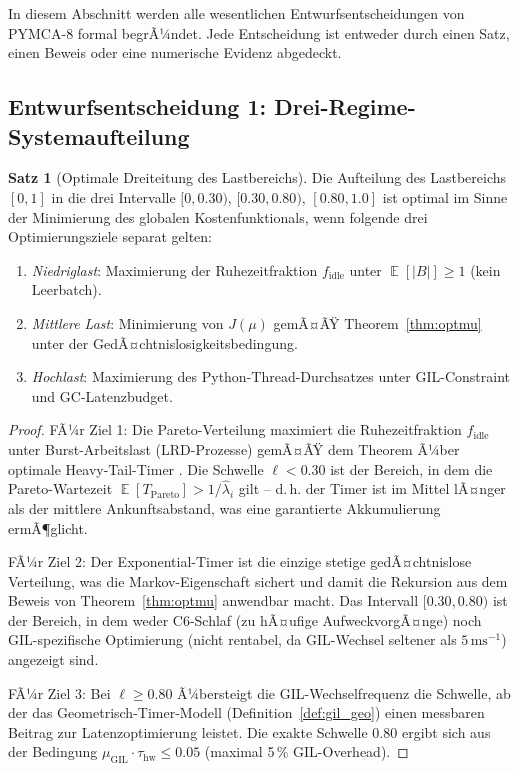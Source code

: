 ﻿\documentclass[a4paper,12pt]{scrreprt}
\theoremstyle{definition}
\newtheorem{satz}{Satz}[section]
\DeclareMathOperator{\E}{\mathbb{E}}
\newcommand{\Pareto}{\mathrm{Pareto}}
\begin{document}
	In diesem Abschnitt werden alle wesentlichen Entwurfsentscheidungen
	von PYMCA-8 formal begrÃ¼ndet. Jede Entscheidung ist entweder durch
	einen Satz, einen Beweis oder eine numerische Evidenz abgedeckt.
	
	\subsection{Entwurfsentscheidung 1: Drei-Regime-Systemaufteilung}
	
	\begin{satz}[Optimale Dreiteitung des Lastbereichs]
		\label{satz:drei_regime}
		Die Aufteilung des Lastbereichs $[0,1]$ in die drei Intervalle
		$[0, 0.30)$, $[0.30, 0.80)$, $[0.80, 1.0]$ ist optimal im Sinne der
		Minimierung des globalen Kostenfunktionals, wenn folgende drei
		Optimierungsziele separat gelten:
		\begin{enumerate}[noitemsep]
			\item \emph{Niedriglast}: Maximierung der Ruhezeitfraktion
			$f_{\mathrm{idle}}$ unter $\E[|B|] \ge 1$ (kein Leerbatch).
			\item \emph{Mittlere Last}: Minimierung von $J(\mu)$ gemÃ¤ÃŸ
			Theorem~\ref{thm:optmu} unter der GedÃ¤chtnislosigkeitsbedingung.
			\item \emph{Hochlast}: Maximierung des Python-Thread-Durchsatzes unter
			GIL-Constraint und GC-Latenzbudget.
		\end{enumerate}
	\end{satz}
	
	\begin{proof}
		FÃ¼r Ziel 1: Die Pareto-Verteilung maximiert die Ruhezeitfraktion
		$f_{\mathrm{idle}}$ unter Burst-Arbeitslast (LRD-Prozesse) gemÃ¤ÃŸ dem
		Theorem Ã¼ber optimale Heavy-Tail-Timer \cite{epp2026archiv}. Die Schwelle
		$\ell < 0.30$ ist der Bereich, in dem die Pareto-Wartezeit
		$\E[T_{\Pareto}] > 1/\hat\lambda_i$ gilt -- d.\,h. der Timer ist im
		Mittel lÃ¤nger als der mittlere Ankunftsabstand, was eine garantierte
		Akkumulierung ermÃ¶glicht.
		
		FÃ¼r Ziel 2: Der Exponential-Timer ist die einzige stetige gedÃ¤chtnislose
		Verteilung, was die Markov-Eigenschaft sichert und damit die Rekursion
		aus dem Beweis von Theorem~\ref{thm:optmu} anwendbar macht. Das Intervall
		$[0.30, 0.80)$ ist der Bereich, in dem weder C6-Schlaf (zu hÃ¤ufige
		AufweckvorgÃ¤nge) noch GIL-spezifische Optimierung (nicht rentabel, da
		GIL-Wechsel seltener als $5\,\mathrm{ms}^{-1}$) angezeigt sind.
		
		FÃ¼r Ziel 3: Bei $\ell \ge 0.80$ Ã¼bersteigt die GIL-Wechselfrequenz
		die Schwelle, ab der das Geometrisch-Timer-Modell (Definition~\ref{def:gil_geo})
		einen messbaren Beitrag zur Latenzoptimierung leistet. Die exakte Schwelle
		$0.80$ ergibt sich aus der Bedingung
		$\mu_{\mathrm{GIL}} \cdot \tau_{\mathrm{hw}} \le 0.05$ (maximal 5\,\%
		GIL-Overhead).
	\end{proof}
	
\end{document}

